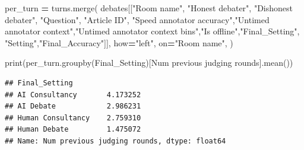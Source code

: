 \documentclass[
]{article}
\newenvironment{Shaded}{\begin{snugshade}}{\end{snugshade}}
\newcommand{\BuiltInTok}[1]{#1}
\newcommand{\NormalTok}[1]{#1}
\newcommand{\OperatorTok}[1]{\textcolor[rgb]{0.81,0.36,0.00}{\textbf{#1}}}
\newcommand{\StringTok}[1]{\textcolor[rgb]{0.31,0.60,0.02}{#1}}
\begin{document}
\begin{Shaded}
\begin{Highlighting}[]
\NormalTok{per\_turn }\OperatorTok{=}\NormalTok{ turns.merge(}
\NormalTok{        debates[[}\StringTok{"Room name"}\NormalTok{, }\StringTok{"Honest debater"}\NormalTok{, }\StringTok{"Dishonest debater"}\NormalTok{, }\StringTok{"Question"}\NormalTok{, }\StringTok{"Article ID"}\NormalTok{,}
                 \StringTok{"Speed annotator accuracy"}\NormalTok{,}\StringTok{"Untimed annotator context"}\NormalTok{,}\StringTok{"Untimed annotator context bins"}\NormalTok{,}\StringTok{"Is offline"}\NormalTok{,}\StringTok{"Final\_Setting"}\NormalTok{, }\StringTok{"Setting"}\NormalTok{,}\StringTok{"Final\_Accuracy"}\NormalTok{]],}
\NormalTok{        how}\OperatorTok{=}\StringTok{"left"}\NormalTok{,}
\NormalTok{        on}\OperatorTok{=}\StringTok{"Room name"}\NormalTok{,}
\NormalTok{    )}

\BuiltInTok{print}\NormalTok{(per\_turn.groupby(}\StringTok{\textquotesingle{}Final\_Setting\textquotesingle{}}\NormalTok{)[}\StringTok{\textquotesingle{}Num previous judging rounds\textquotesingle{}}\NormalTok{].mean())}
\end{Highlighting}
\end{Shaded}

\begin{verbatim}
## Final_Setting
## AI Consultancy       4.173252
## AI Debate            2.986231
## Human Consultancy    2.759310
## Human Debate         1.475072
## Name: Num previous judging rounds, dtype: float64
\end{verbatim}
\end{document}
